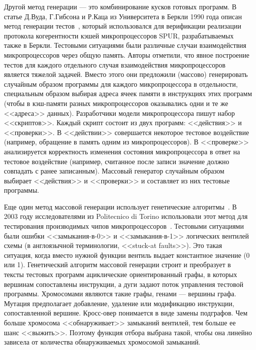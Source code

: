 Другой метод генерации --- это комбинирование кусков готовых программ. В статье Д.Вуда, Г.Гибсона и Р.Каца из Университета в Беркли 1990 года описан метод генерации тестов~\cite{Berkeley89}, который использовался для верификации реализации протокола когерентности кэшей микропроцессоров SPUR, разрабатываемых также в Беркли. Тестовыми ситуациями были различные случаи взаимодействия микропроцессоров через общую память. Авторы отметили, что явное построение тестов для каждого отдельного случая взаимодействия микропроцессоров является тяжелой задачей. Вместо этого они предложили (массово) генерировать случайным образом программы для каждого микропроцессора в отдельности, специальным образом выбирая адреса ячеек памяти в инструкциях этих программ (чтобы в кэш-памяти разных микропроцессоров оказывались одни и те же <<адреса>> данных). Разработчики модели микропроцессора пишут набор <<скриптов>>. Каждый скрипт состоит из двух программ: <<действия>> и <<проверки>>. В <<действии>> совершается некоторое тестовое воздействие (например, обращение в память одним из микропроцессоров). В <<проверке>> анализируется корректность изменения состояния микропроцессора в ответ на тестовое воздействие (например, считанное после записи значение должно совпадать с ранее записанным). Массовый генератор случайным образом выбирает <<действия>> и <<проверки>> и составляет из них тестовые программы.


Еще один метод массовой генерации использует генетические алгоритмы~\cite{GeneticAlgorithms}. В 2003 году исследователями из Politecnico di Torino использовали этот метод для тестирования производимых чипов микропроцессоров~\cite{microGP}. Тестовыми ситуациями были ошибки <<замыкания-в-0>> и <<замыкания-в-1>> логических вентилей схемы (в англоязычной терминологии, <<stuck-at faults>>). Это такая ситуация, когда вместо нужной функции вентиль выдает константное значение (0 или 1). Генетический алгоритм массовой генерации строит и преобразует в тексты тестовых программ ациклические ориентированный графы, в которых вершинам сопоставлены инструкции, а дуги задают поток управления тестовой программы. Хромосомами являются такие графы, генами --- вершины графа. Мутация предполагает добавление, удаление или модификацию инструкции, сопоставленной вершине. Кросс-овер понимается в виде замены подграфов. Чем больше хромосома <<обнаруживает>> замыканий вентилей, тем больше ее шанс <<выжить>>. Поэтому функция отбора выбрана такой, чтобы она линейно зависела от количества обнаруживаемых хромосомой замыканий.

